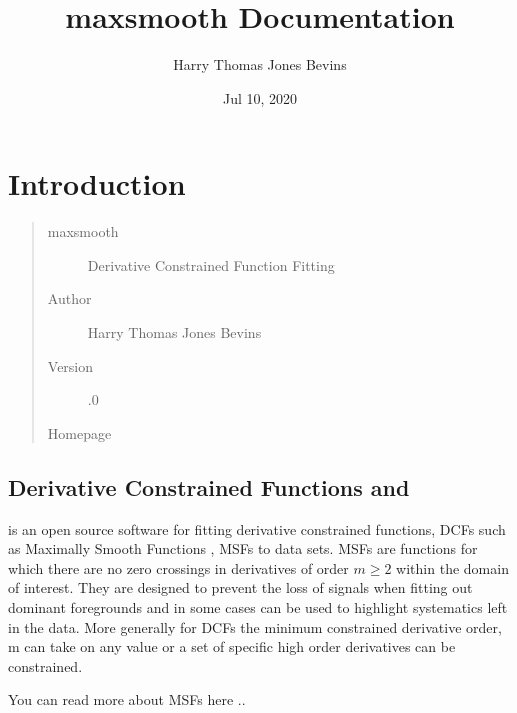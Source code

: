 \documentclass[letterpaper,10pt,english]{sphinxmanual}
\title{maxsmooth Documentation}
\date{Jul 10, 2020}
\author{Harry Thomas Jones Bevins}
\begin{document}
\pagestyle{empty}
\sphinxmaketitle
\pagestyle{plain}
\sphinxtableofcontents
\pagestyle{normal}
\label{\detokenize{source/index::doc}}



\chapter{Introduction}
\label{\detokenize{source/intro:introduction}}\begin{quote}\begin{description}
\item[{maxsmooth}] \leavevmode
Derivative Constrained Function Fitting

\item[{Author}] \leavevmode
Harry Thomas Jones Bevins

\item[{Version}] .0

\item[{Homepage}] \leavevmode
{}

\end{description}\end{quote}


\section{Derivative Constrained Functions and }
\label{\detokenize{source/intro:derivative-constrained-functions-and-maxsmooth}}
 is an open source software for fitting derivative constrained
functions, DCFs such as Maximally Smooth Functions
, MSFs to data sets. MSFs are functions for which there are no zero
crossings in derivatives of order \(m \geq 2\) within the domain of interest.
They are designed to prevent the loss of
signals when fitting out dominant foregrounds and in some cases can be used to
highlight systematics left in the data. More generally for DCFs the minimum
constrained derivative order, m can take on any value or a set of
specific high order derivatives can be constrained.

You can read more about MSFs here ..
\end{document}
